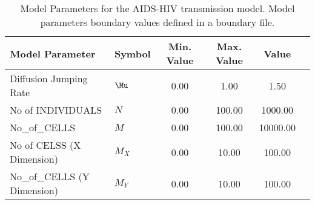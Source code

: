 \begin{table}
\centering
\begin{tabular}{p{5cm}lcccc}
{\bf Model Parameter} & {\bf Symbol} & {\bf Min. Value} & {\bf Max. Value} & {\bf Value}\\
\hline\hline
Diffusion Jumping Rate & $\Mu$ & 0.00 & 1.00 & 1.50\\
No of INDIVIDUALS & $N$ & 0.00 & 100.00 & 1000.00\\
No_of_CELLS & $M$ & 0.00 & 100.00 & 10000.00\\
No of CELSS (X Dimension) & $M_X$ & 0.00 & 10.00 & 100.00\\
No_of_CELLS (Y Dimension) & $M_Y$ & 0.00 & 10.00 & 100.00\\
\hline\hline
\end{tabular}
\caption{Model Parameters for the AIDS-HIV transmission model. Model parameters boundary values defined in a boundary file.}
\end{table}
